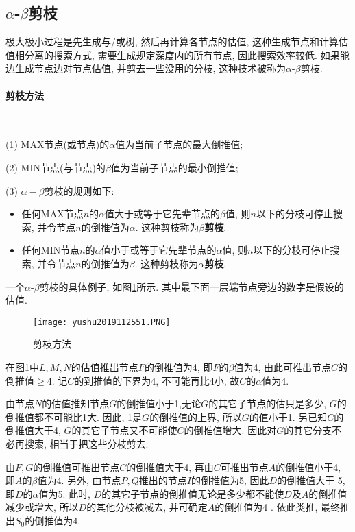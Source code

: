 \subsection{$\alpha$-$\beta$剪枝}
极大极小过程是先生成与/或树, 然后再计算各节点的估值, 这种生成节点和计算估值相分离的搜索方式, 需要生成规定深度内的所有节点, 因此搜索效率较低.
如果能边生成节点边对节点估值, 并剪去一些没用的分枝, 这种技术被称为$\alpha$-$\beta$剪枝.
\paragraph{剪枝方法}~{}

(1) \textup{MAX}节点(或节点)的$\alpha$值为当前子节点的最大倒推值;

(2) \textup{MIN}节点(与节点)的$\beta$值为当前子节点的最小倒推值;

(3) $\alpha-\beta$剪枝的规则如下:
    \begin{itemize}
    \item 任何MAX节点$n$的$\alpha$值大于或等于它先辈节点的$\beta$值, 则$n$以下的分枝可停止搜索, 并令节点$n$的倒推值为$\alpha$. 这种剪枝称为\textbf{$\beta$剪枝}.
    \item 任何MIN节点$n$的$\alpha$值小于或等于它先辈节点的$\alpha$值, 则$n$以下的分枝可停止搜索, 并令节点$n$的倒推值为$\beta$. 这种剪枝称为\textbf{$\alpha$剪枝}.
    \end{itemize}
\begin{example}
    一个$\alpha$-$\beta$剪枝的具体例子, 如图\ref{AI32fig51}所示. 其中最下面一层端节点旁边的数字是假设的估值.
\end{example}
\begin{figure}[H]
\centering
\texttt{[image: yushu2019112551.PNG]}
\caption{剪枝方法}
\label{AI32fig51}
\end{figure}
在图\ref{AI32fig51}中$L,M,N$的估值推出节点$F$的倒推值为4, 即$F$的$\beta$值为4, 由此可推出节点$C$的倒推值$\geq 4$.
记$C$的到推值的下界为4, 不可能再比4小, 故$C$的$\alpha$值为4.

由节点$N$的估值推知节点$G$的倒推值小于1,无论$G$的其它子节点的估只是多少, $G$的倒推值都不可能比1大. 因此, 1是$G$的倒推值的上界, 所以$G$的值小于1.
另已知$C$的倒推值大于4, $G$的其它子节点又不可能使$C$的倒推值增大. 因此对$G$的其它分支不必再搜索, 相当于把这些分枝剪去.

由$F,G$的倒推值可推出节点$C$的倒推值大于4, 再由$C$可推出节点$A$的倒推值小于4, 即$A$的$\beta$值为4. 另外, 由节点$P,Q$推出的节点$I$的倒推值为5, 因此$D$的倒推值大于 5, 即$D$的$\alpha$值为5.
此时, $D$的其它子节点的倒推值无论是多少都不能使$D$及$A$的倒推值减少或增大, 所以$D$的其他分枝被减去, 并可确定$A$的倒推值为4 .
依此类推, 最终推出$S_0$的倒推值为4.
